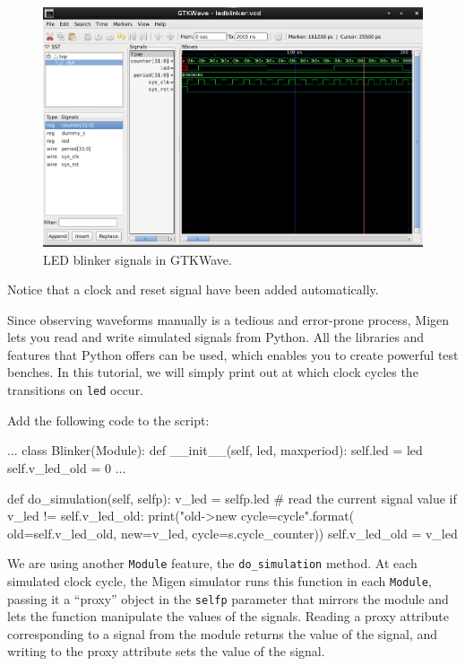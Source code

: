 \documentclass[11pt]{paper}
\begin{document}
\begin{figure}[h]
\centering
\includegraphics[width=\textwidth]{gtkwave.png}
\caption{LED blinker signals in GTKWave.}
\end{figure}

Notice that a clock and reset signal have been added automatically.

Since observing waveforms manually is a tedious and error-prone process, Migen lets you read and write simulated signals from Python. All the libraries and features that Python offers can be used, which enables you to create powerful test benches. In this tutorial, we will simply print out at which clock cycles the transitions on \verb!led! occur.

Add the following code to the script:
\begin{samepage}
\begin{verbatimtab}
...
class Blinker(Module):
	def __init__(self, led, maxperiod):
		self.led = led
		self.v_led_old = 0
		...

	def do_simulation(self, selfp):
		v_led = selfp.led # read the current signal value
		if v_led != self.v_led_old:
			print("{old}->{new} cycle={cycle}".format(
				old=self.v_led_old, new=v_led,
				cycle=s.cycle_counter))
			self.v_led_old = v_led
\end{verbatimtab}
\end{samepage}

We are using another \verb!Module! feature, the \verb!do_simulation! method. At each simulated clock cycle, the Migen simulator runs this function in each \verb!Module!, passing it a ``proxy'' object in the \verb!selfp! parameter that mirrors the module and lets the function manipulate the values of the signals. Reading a proxy attribute corresponding to a signal from the module returns the value of the signal, and writing to the proxy attribute sets the value of the signal.
\end{document}
